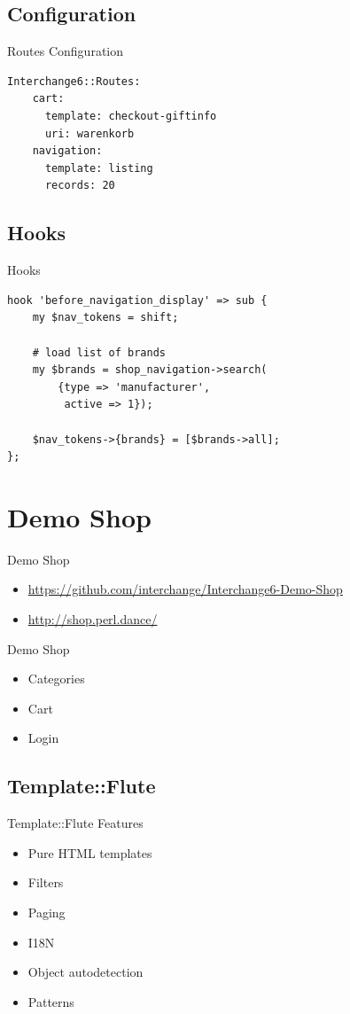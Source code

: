 \subsection{Configuration}
\begin{frame}[fragile]{Routes Configuration}
\begin{lstlisting}
Interchange6::Routes:
    cart:
      template: checkout-giftinfo
      uri: warenkorb
    navigation:
      template: listing
      records: 20
\end{lstlisting}
\end{frame}

\subsection{Hooks}
\begin{frame}[fragile]{Hooks}
\begin{lstlisting}
hook 'before_navigation_display' => sub {
    my $nav_tokens = shift;

    # load list of brands
    my $brands = shop_navigation->search(
        {type => 'manufacturer',
         active => 1});

    $nav_tokens->{brands} = [$brands->all];
};
\end{lstlisting}
\end{frame}

\section{Demo Shop}
\begin{frame}{Demo Shop}
\begin{itemize}
\item  \url{https://github.com/interchange/Interchange6-Demo-Shop}
\item  \url{http://shop.perl.dance/}
\end{itemize}
\end{frame}

\begin{frame}{Demo Shop}
\begin{itemize}
\item Categories
\item Cart
\item Login
\end{itemize}
\end{frame}

\subsection{Template::Flute}
\begin{frame}{Template::Flute Features}
\begin{itemize}
\item Pure HTML templates
\item Filters
\item Paging
\item I18N
\item Object autodetection
\item Patterns
\end{itemize}
\end{frame}

